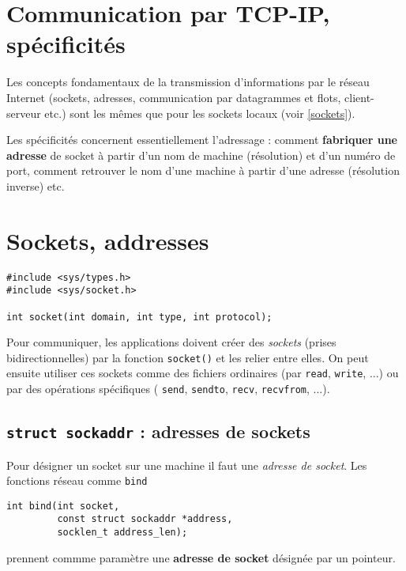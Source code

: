 
\section{Communication par TCP-IP, spécificités}

Les concepts fondamentaux de la transmission d'informations par le
réseau Internet (sockets, adresses, communication par datagrammes et flots,
client-serveur etc.) sont les mêmes que pour les sockets locaux (voir
\ref{sockets}).

Les spécificités concernent essentiellement l'adressage : comment
\textbf{fabriquer une adresse} de socket à partir d'un nom de machine
(résolution) et d'un numéro de port, comment retrouver le nom d'une
machine à partir d'une adresse (résolution inverse) etc.


\section{Sockets, addresses}


\extrait
\begin{lstlisting}
#include <sys/types.h>
#include <sys/socket.h>

int socket(int domain, int type, int protocol);
\end{lstlisting}


Pour communiquer, les applications doivent créer des \emph{sockets}
(prises bidirectionnelles) par la fonction \texttt{socket()} et les
relier entre elles.  On peut ensuite utiliser ces sockets comme des
fichiers ordinaires (par \texttt{read}, \texttt{write}, ...) ou par
des opérations spécifiques ( \texttt{send}, \texttt{sendto},
\texttt{recv}, \texttt{recvfrom}, ...).


\subsection{ \texttt{struct sockaddr} : adresses de sockets}

Pour désigner un socket sur une machine il faut une \emph{adresse de
socket}. Les fonctions réseau comme \texttt{bind}


\begin{lstlisting}
int bind(int socket,
         const struct sockaddr *address,
         socklen_t address_len);
\end{lstlisting}

prennent commme paramètre une \textbf{adresse de socket} désignée par
un pointeur.

